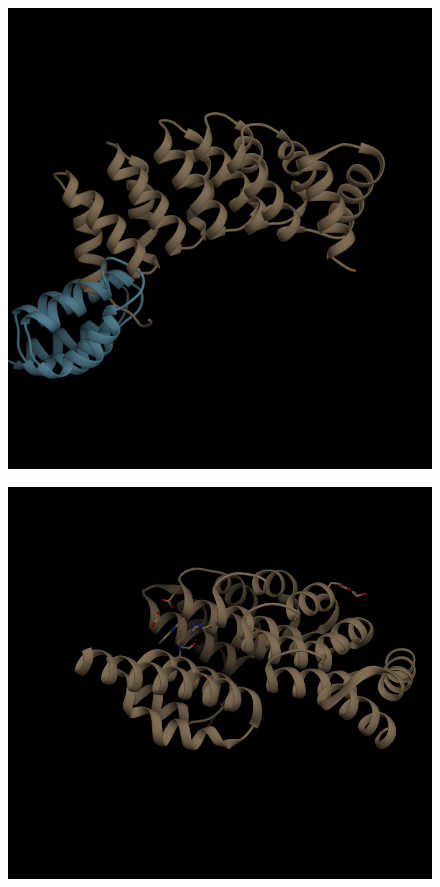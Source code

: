\documentclass{article}
\begin{document}
\begin{figure}
\centering

\begin{minipage}{.50\textwidth}
  \centering
  \includegraphics[width=.9\linewidth]{t53_initial}
  \label{fig:test1}

  \centering
  \includegraphics[width=.9\linewidth]{t53_native}
  \label{fig:test2}


\end{minipage}
\end{figure}
\end{document}
